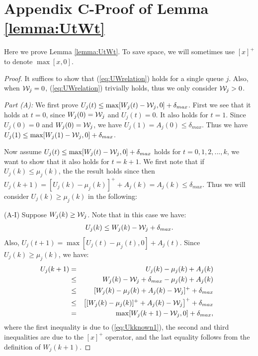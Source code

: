 \documentclass[journal]{IEEEtran}
\newcommand{\script}[1]{{{\cal{#1} }}}
\begin{document}
\section*{Appendix C-Proof of Lemma \ref{lemma:UtWt}}
Here we prove Lemma \ref{lemma:UtWt}.  To save space, we will sometimes use $[x]^+$ to denote $\max[x,0]$. 
\begin{proof}
It suffices to show that (\ref{eq:UWrelation}) holds for a single queue $j$. Also, when $\script{W}_j=0$, (\ref{eq:UWrelation}) trivially holds, thus we only consider $\script{W}_j>0$.

\emph{Part (A):} We first prove $U_j(t)\leq\max[W_j(t)-\script{W}_j, 0]+\delta_{max}$. First we see that it holds at $t=0$, since $W_j(0)=\script{W}_j$ and $U_j(t)=0$. It also holds for $t=1$. Since $U_j(0)=0$ and $W_j(0)=\script{W}_j$, we have $U_j(1)=A_j(0)\leq\delta_{max}$. Thus we have $U_j(1)\leq\max[W_j(1)-\script{W}_j, 0]+\delta_{max}$. 

Now assume $U_j(t)\leq\max[W_j(t)-\script{W}_j, 0]+\delta_{max}$ holds for $t=0,1,2,..., k$, we want to show that it also holds for $t=k+1$.
We first note that if $U_j(k)\leq\mu_j(k)$, the the result holds since then $U_j(k+1)=[U_j(k)-\mu_j(k)]^++A_j(k) =A_j(k)\leq\delta_{max}$. Thus we will consider $U_j(k)\geq\mu_j(k)$ in the following:

(A-I) Suppose $W_j(k)\geq\script{W}_j$. Note that in this case we have: 
\begin{eqnarray}
U_j(k)\leq W_j(k)-\script{W}_j+\delta_{max}.\label{eq:Ukknown1}
\end{eqnarray} 
Also, $U_j(t+1)=\max[U_j(t)-\mu_j(t),0]+A_j(t)$. Since $U_j(k)\geq\mu_j(k)$, we have:
\begin{eqnarray*}
\hspace{-.1in}U_j(k+1)&=&U_j(k)-\mu_j(k)+A_j(k)\\
\hspace{-.1in}&\leq& W_j(k)-\script{W}_j+\delta_{max}-\mu_j(k)+A_j(k)\\
\hspace{-.1in}&\leq& [W_j(k)-\mu_j(k)+A_j(k)-\script{W}_j]^++\delta_{max}\\
\hspace{-.1in}&\leq& \big[[W_j(k)-\mu_j(k)]^++A_j(k)-\script{W}_j\big]^++\delta_{max}\\
\hspace{-.1in}&=&\max[W_j(k+1)-\script{W}_j, 0]+\delta_{max},
\end{eqnarray*}
where the first inequality is due to (\ref{eq:Ukknown1}), the second and third inequalities are due to the $[x]^+$ operator, and the last equality follows from the definition of $W_j(k+1)$.


\end{proof}
\end{document}
